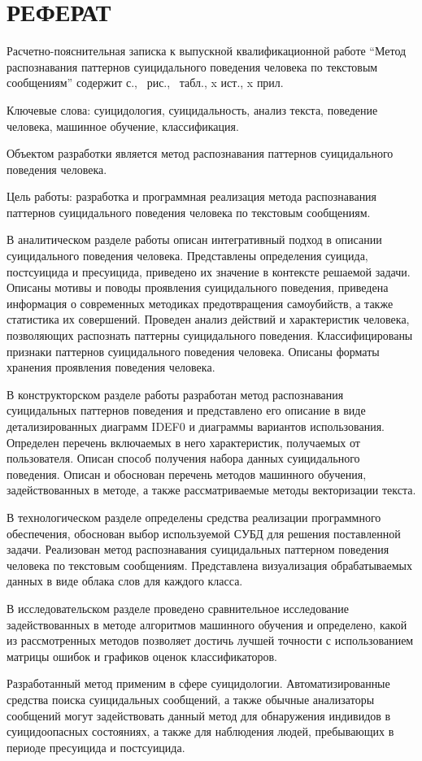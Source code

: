 \section*{РЕФЕРАТ}

Расчетно-пояснительная записка к выпускной квалификационной работе ``Метод распознавания паттернов суицидального поведения человека по текстовым сообщениям'' содержит \pageref{LastPage} с., \totalfigures\ рис., \totaltables\ табл., x ист., x прил.

Ключевые слова: суицидология, суицидальность, анализ текста, поведение человека, машинное обучение, классификация.

Объектом разработки является метод распознавания паттернов суицидального поведения человека.

Цель работы: разработка и программная реализация метода распознавания паттернов суицидального поведения человека по текстовым сообщениям.

В аналитическом разделе работы описан интегративный подход в описании суицидального поведения человека. Представлены определения суицида, постсуицида и пресуицида, приведено их значение в контексте решаемой задачи. Описаны мотивы и поводы проявления суицидального поведения, приведена информация о современных методиках предотвращения самоубийств, а также статистика их совершений. Проведен анализ действий и характеристик человека, позволяющих распознать паттерны суицидального поведения. Классифицированы признаки паттернов суицидального поведения человека. Описаны форматы хранения проявления поведения человека.

В конструкторском разделе работы разработан метод распознавания суицидальных паттернов поведения и представлено его описание в виде детализированных диаграмм IDEF0 и диаграммы вариантов использования. Определен перечень включаемых в него характеристик, получаемых от пользователя. Описан способ получения набора данных суицидального поведения. Описан и обоснован перечень методов машинного обучения, задействованных в методе, а также рассматриваемые методы векторизации текста.

В технологическом разделе определены средства реализации программного обеспечения, обоснован выбор используемой СУБД для решения поставленной задачи. Реализован метод распознавания суицидальных паттерном поведения человека по текстовым сообщениям. Представлена визуализация обрабатываемых данных в виде облака слов для каждого класса.

В исследовательском разделе проведено сравнительное исследование задействованных в методе алгоритмов машинного обучения и определено, какой из рассмотренных методов позволяет достичь лучшей точности с использованием матрицы ошибок и графиков оценок классификаторов.

Разработанный метод применим в сфере суицидологии. Автоматизированные средства поиска суицидальных сообщений, а также обычные анализаторы сообщений могут задействовать данный метод для обнаружения индивидов в суицидоопасных состояниях, а также для наблюдения людей, пребывающих в периоде пресуицида и постсуицида.

\pagebreak